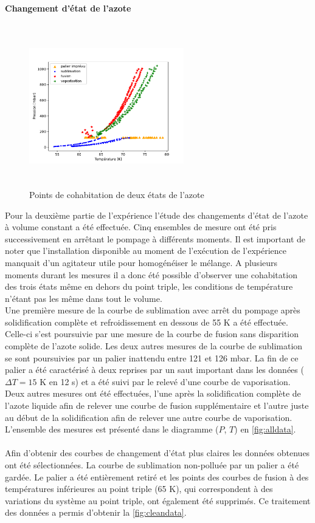 \paragraph*{Changement d'état de l'azote}
\begin{figure}
    \centering
    \includegraphics[width=0.6\textwidth, height=7cm]{figures/etats_azote_all_data.pdf}
    \caption{Points de cohabitation de deux états de l'azote}
    \label{fig:alldata}
\end{figure}

Pour la deuxième partie de l'expérience l'étude des changements d'état de l'azote à volume constant a été effectuée. Cinq ensembles de mesure ont été pris successivement en arrêtant le pompage à différents moments. Il est important de noter que l'installation disponible au moment de l'exécution de l'expérience manquait d'un agitateur utile pour homogénéiser le mélange. A plusieurs moments durant les mesures il a donc été possible d'observer une cohabitation des trois états même en dehors du point triple, les conditions de température n'étant pas les même dans tout le volume. \\
Une première mesure de la courbe de sublimation avec arrêt du pompage après solidification complète et refroidissement en dessous de 55 \si{\kelvin} a été effectuée. Celle-ci s'est poursuivie par une mesure de la courbe de fusion sans disparition complète de l'azote solide. Les deux autres mesures de la courbe de sublimation se sont poursuivies par un palier inattendu entre 121 et 126 \si{\milli \bar}. La fin de ce palier a été caractérisé à deux reprises par un saut important dans les données (\(\Delta T = 15\) \si{\kelvin} en 12 \si{\second}) et a été suivi par le relevé d'une courbe de vaporisation. Deux autres mesures ont été effectuées, l'une après la solidification complète de l'azote liquide afin de relever une courbe de fusion supplémentaire et l'autre juste au début de la solidification afin de relever une autre courbe de vaporisation. L'ensemble des mesures est présenté dans le diagramme (\(P\), \(T\)) en \autoref{fig:alldata}. \\
\\
Afin d'obtenir des courbes de changement d'état plus claires les données obtenues ont été sélectionnées. La courbe de sublimation non-polluée par un palier a été gardée. Le palier a été entièrement retiré et les points des courbes de fusion à des températures inférieures au point triple (65 \si{\kelvin}), qui correspondent à des variations du système au point triple, ont également été supprimés. Ce traitement des données a permis d'obtenir la \autoref{fig:cleandata}.

